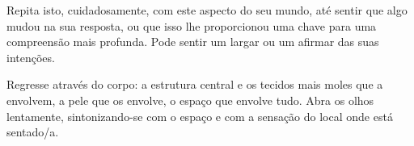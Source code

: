 Repita isto, cuidadosamente, com este aspecto do seu mundo, até sentir que algo mudou na sua resposta, ou que isso lhe proporcionou uma chave para uma compreensão mais profunda. Pode sentir um largar ou um afirmar das suas intenções.

Regresse através do corpo: a estrutura central e os tecidos mais moles que a envolvem, a pele que os envolve, o espaço que envolve tudo. Abra os olhos lentamente, sintonizando-se com o espaço e com a sensação do local onde está sentado/a.
